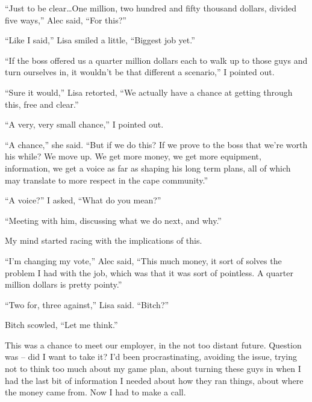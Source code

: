 ``Just to be clear\ldots One million, two hundred and fifty thousand dollars, divided five ways,'' Alec said, ``For this?''



``Like I said,'' Lisa smiled a little, ``Biggest job yet.''



``If the boss offered us a quarter million dollars each to walk up to those guys and turn ourselves in, it wouldn't be that different a scenario,'' I pointed out.



``Sure it would,'' Lisa retorted, ``We actually have a chance at getting through this, free and clear.''



``A very, very small chance,'' I pointed out.



``A chance,'' she said.  ``But if we do this?  If we prove to the boss that we're worth his while?  We move up.  We get more money, we get more equipment, information, we get a voice as far as shaping his long term plans, all of which may translate to more respect in the cape community.''



``A voice?'' I asked, ``What do you mean?''



``Meeting with him, discussing what we do next, and why.''



My mind started racing with the implications of this.



``I'm changing my vote,'' Alec said, ``This much money, it sort of solves the problem I had with the job, which was that it was sort of pointless.  A quarter million dollars is pretty pointy.''



``Two for, three against,'' Lisa said.  ``Bitch?''



Bitch scowled, ``Let me think.''



This was a chance to meet our employer, in the not too distant future.  Question was – did I want to take it?  I'd been procrastinating, avoiding the issue, trying not to think too much about my game plan, about turning these guys in when I had the last bit of information I needed about how they ran things, about where the money came from.  Now I had to make a call.



